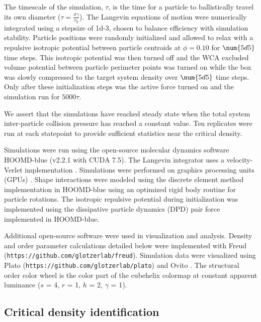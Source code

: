 The timescale of the simulation, $\tau$, is the time for a particle to ballistically travel its own diameter ($\tau = \frac{\sigma\gamma}{v_0}$).
The Langevin equations of motion were numerically integrated using a stepsize of \num{1d-3}, chosen to balance efficiency with simulation stability.
Particle positions were randomly initialized and allowed to relax with a repulsive isotropic potential between particle centroids at $\phi=0.10$ for $\num{5d5}$ time steps.
This isotropic potential was then turned off and the WCA excluded volume potential between particle perimeter points was turned on while the box was slowly compressed to the target system density over $\num{5d5}$ time steps.
Only after these initialization steps was the active force turned on and the simulation run for $5000\tau$.

We assert that the simulations have reached steady state when the total system inter-particle collision pressure has reached a constant value.
Ten replicates were run at each statepoint to provide sufficient statistics near the critical density.

Simulations were run using the open-source molecular dynamics software HOOMD-blue (v2.2.1 with CUDA 7.5).
The Langevin integrator uses a velocity-Verlet implementation \cite{HOOMD_2008}.
Simulations were performed on graphics processing units (GPUs) \cite{HOOMD_2008, HOOMD_2015}.
Shape interactions were modeled using the discrete element method implementation in HOOMD-blue\cite{DEM_2017} using an optimized rigid body routine for particle rotations\cite{HOOMD_2015}.
The isotropic repulsive potential during initialization was implemented using the dissipative particle dynamics (DPD) pair force implemented in HOOMD-blue\cite{DPD_2011}.

Additional open-source software were used in visualization and analysis.
Density and order parameter calculations detailed below were implemented with Freud \cite{freud} (\verb|https://github.com/glotzerlab/freud|).
Simulation data were visualized using Plato (\verb|https://github.com/glotzerlab/plato|) and Ovito \cite{ovito}.
The structural order color wheel is the color part of the cubehelix\cite{cubehelix} colormap at constant apparent luminance ($s$ = 4, $r$ = 1, $h$ = 2, $\gamma$ = 1).

\subsection{Critical density identification}
\label{sec:critical-density}


